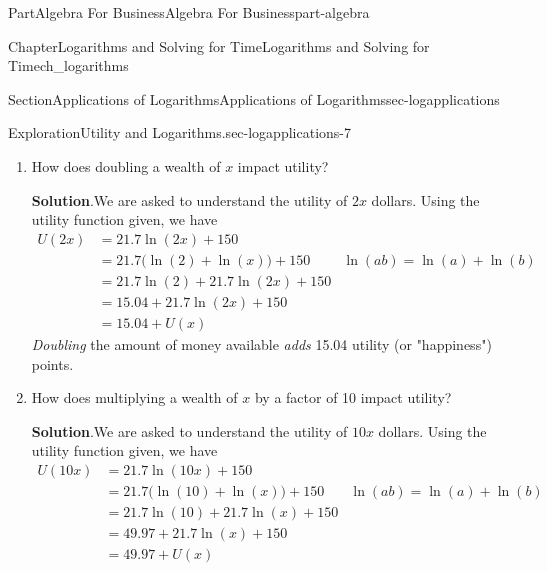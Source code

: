 \documentclass{tufte-book}
\newcommand{\blocktitlefont}{\relax}
\numberwithin{equation}{chapter}
\newcommand{\amp}{&}
\begin{document}
\begin{partptx}{Part}{Algebra For Business}{}{Algebra For Business}{}{}{part-algebra}
\begin{chapterptx}{Chapter}{Logarithms and Solving for Time}{}{Logarithms and Solving for Time}{}{}{ch_logarithms}
\begin{sectionptx}{Section}{Applications of Logarithms}{}{Applications of Logarithms}{}{}{sec-logapplications}
\begin{exploration}{Exploration}{Utility and Logarithms.}{sec-logapplications-7}
\begin{enumerate}[font=\bfseries,label=(\alph*),ref=\alph*]
\par
Finally, consider the values above \textdollar{}1000.  Note that increasing the balance by a factor of 10 \emph{approximately} increases their happiness by 50 utility points. Often, this is because the individual will start with a list of very clear and very productive uses of the money.  As those clear producive uses are taken care of, the individual needs to look for less clear or less productive uses for their money.  Thus, each dollar does not have the same value to the individual!%
\par
Of course, this is an overly simplified example.  In fact, utility functions are much more complex.  But even these more complex functions will share many of the above properties with our logarithmic utility.%
\item{}How does doubling a wealth of \textdollar{}\(x\) impact utility?%
\par\smallskip%
\noindent\textbf{\blocktitlefont Solution}.\hypertarget{sec-logapplications-7-4-2}{}\quad{}We are asked to understand the utility of \textdollar{}\(2x\) dollars.  Using the utility function given, we have%
\begin{align*}
U(2x) \amp = 21.7\ln(2x) + 150 \amp \\
\amp = 21.7\Big(\ln(2) + \ln(x) \Big) + 150 \amp \ln(ab)=\ln(a)+\ln(b) \\
\amp = 21.7\ln(2) + 21.7\ln(2x) + 150 \amp \\
\amp = 15.04 + 21.7\ln(2x) + 150 \amp \\
\amp = 15.04 + U(x) \amp 
\end{align*}
\emph{Doubling} the amount of money available \emph{adds} 15.04 utility (or "happiness") points.%
\item{}How does multiplying a wealth of \textdollar{}\(x\) by a factor of 10 impact utility?%
\par\smallskip%
\noindent\textbf{\blocktitlefont Solution}.\hypertarget{sec-logapplications-7-5-2}{}\quad{}We are asked to understand the utility of \textdollar{}\(10x\) dollars.  Using the utility function given, we have%
\begin{align*}
U(10x) \amp = 21.7\ln(10x) + 150 \amp \\
\amp = 21.7\Big(\ln(10) + \ln(x) \Big) + 150 \amp \ln(ab)=\ln(a)+\ln(b) \\
\amp = 21.7\ln(10) + 21.7\ln(x) + 150 \amp \\
\amp = 49.97 + 21.7\ln(x) + 150 \amp \\
\amp = 49.97 + U(x) \amp 
\end{align*}

\end{enumerate}
\end{exploration}
\end{sectionptx}
\end{chapterptx}
\end{partptx}
\end{document}
